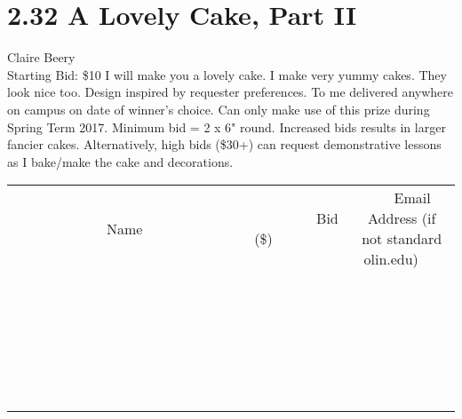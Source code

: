 \documentclass[11pt]{article}
\begin{document}
\section*{2.32 A Lovely Cake, Part II}
Claire Beery
\\
Starting Bid: \$10
\newline
I will make you a lovely cake. I make very yummy cakes. They look nice too. Design inspired by requester preferences. To me delivered anywhere on campus on date of winner's choice. Can only make use of this prize during Spring Term 2017. Minimum bid = 2 x 6" round. Increased bids results in larger fancier cakes. Alternatively, high bids (\$30+) can request demonstrative lessons as I bake/make the cake and decorations.
\\[6ex]
\begin{tabular}{c c c}
~~~~~~~~~~~~~Name~~~~~~~~~~~~~ & ~~~~~~~~~Bid (\$)~~~~~~~~~  & ~~~Email Address (if not standard olin.edu)~~~\\
 & & \\
\hline
 & & \\
\hline
 & & \\
\hline
 & & \\
\hline
 & & \\
\hline
 & & \\
\hline
 & & \\
\hline
 & & \\
\hline
 & & \\
\hline
 & & \\
\hline
 & & \\
\hline
 & & \\
\hline
 & & \\
\hline
 & & \\
\hline
 & & \\
\hline
 & & \\
\hline
 & & \\
\hline
 & & \\
\hline
 & & \\
\hline
 & & \\
\hline
 & & \\
\hline
 & & \\
\hline
 & & \\
\hline
 & & \\
\hline
 & & \\
\hline
 & & \\
\hline
\end{tabular}
\newpage
\end{document}

